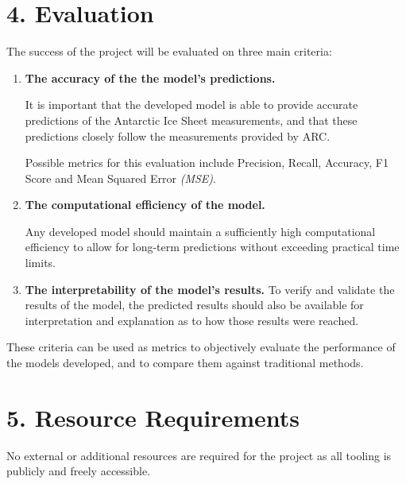 \documentclass[11pt, a4paper, twoside, openright]{report}
\begin{document}
\section*{4. Evaluation}

The success of the project will be evaluated on three main
criteria:
\begin{enumerate}
\item \textbf{The accuracy of the the model's predictions.}
  
  It is important that the developed model is able to
  provide accurate predictions of the Antarctic Ice Sheet
  measurements, and that these predictions closely follow
  the measurements provided by ARC.
  
  Possible metrics for
  this evaluation include Precision, Recall, Accuracy,
  F1 Score and Mean Squared Error \textit{(MSE)}.
\item \textbf{The computational efficiency of the model.}

  Any developed model should maintain a sufficiently high
  computational efficiency to allow for long-term predictions
  without exceeding practical time limits.
\item \textbf{The interpretability of the model's results.}
  To verify and validate the results of the model, the 
  predicted results should also be available for 
  interpretation and explanation as to how those results
  were reached.
\end{enumerate}
These criteria can be used as metrics to objectively
evaluate the performance of the models developed, and
to compare them against traditional methods.

\section*{5. Resource Requirements}

No external or additional resources are required for the
project as all tooling is publicly and freely accessible.

\backmatter



\end{document}
